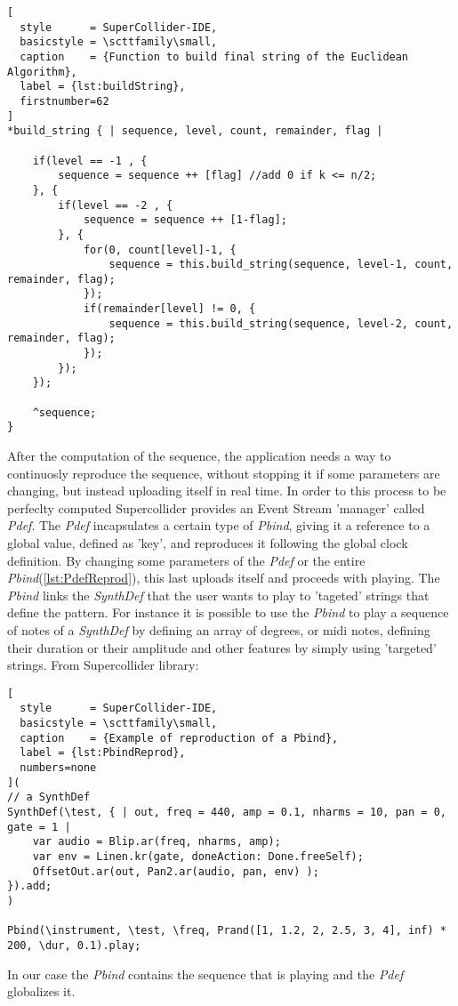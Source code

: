 \documentclass[main.tex]{subfiles}
\begin{document}
\begin{lstlisting}[
  style      = SuperCollider-IDE,
  basicstyle = \scttfamily\small,
  caption    = {Function to build final string of the Euclidean Algorithm},
  label = {lst:buildString},
  firstnumber=62
]
*build_string { | sequence, level, count, remainder, flag |

	if(level == -1 , {
		sequence = sequence ++ [flag] //add 0 if k <= n/2;
	}, {
		if(level == -2 , {
			sequence = sequence ++ [1-flag];
		}, {
			for(0, count[level]-1, {
				sequence = this.build_string(sequence, level-1, count, remainder, flag);
			});
			if(remainder[level] != 0, {
				sequence = this.build_string(sequence, level-2, count, remainder, flag);
			});
		});
	});

	^sequence;
}

\end{lstlisting}

After the computation of the sequence, the application needs a way to continuosly reproduce the sequence, without stopping it if some parameters are changing, but instead uploading itself in real time. In order to this process to be perfeclty computed Supercollider provides an Event Stream 'manager' called \textit{Pdef}. The \textit{Pdef} incapsulates a certain type of \textit{Pbind}, giving it a reference to a global value, defined as 'key', and reproduces it following the global clock definition. By changing some parameters of the \textit{Pdef} or the entire \textit{Pbind}(\autoref{lst:PdefReprod}), this last uploads itself and proceeds with playing. The \textit{Pbind} links the \textit{SynthDef} that the user wants to play to 'tageted' strings that define the pattern. For instance it is possible to use the \textit{Pbind} to play a sequence of notes of a \textit{SynthDef} by defining an array of degrees, or midi notes, defining their duration or their amplitude and other features by simply using 'targeted' strings. From Supercollider library: 
\begin{lstlisting}[
  style      = SuperCollider-IDE,
  basicstyle = \scttfamily\small,
  caption    = {Example of reproduction of a Pbind},
  label = {lst:PbindReprod},
  numbers=none
](
// a SynthDef
SynthDef(\test, { | out, freq = 440, amp = 0.1, nharms = 10, pan = 0, gate = 1 |
    var audio = Blip.ar(freq, nharms, amp);
    var env = Linen.kr(gate, doneAction: Done.freeSelf);
    OffsetOut.ar(out, Pan2.ar(audio, pan, env) );
}).add;
)

Pbind(\instrument, \test, \freq, Prand([1, 1.2, 2, 2.5, 3, 4], inf) * 200, \dur, 0.1).play;
\end{lstlisting}
In our case the \textit{Pbind} contains the sequence that is playing and the \textit{Pdef} globalizes it. 
\end{document}
